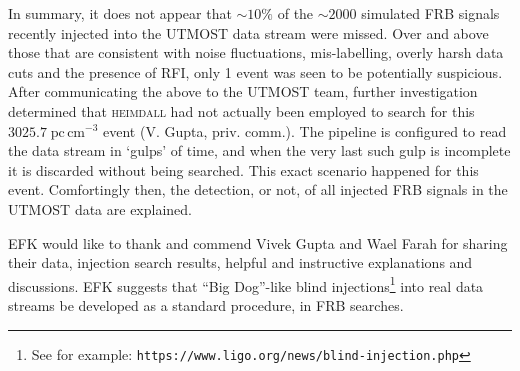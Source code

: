 \documentclass[RNAAS]{aastex62}
\begin{document}
In summary, it does not appear that $\sim10\%$ of the $\sim 2000$ simulated FRB signals recently injected into the UTMOST data stream were missed. Over and above those that are consistent with noise fluctuations, mis-labelling, overly harsh data cuts and the presence of RFI, only 1 event was seen to be potentially suspicious. After communicating the above to the UTMOST team, further investigation determined that \textsc{heimdall} had not actually been employed to search for this $3025.7\;\mathrm{pc}\,\mathrm{cm}^{-3}$ event (V. Gupta, priv. comm.). The pipeline is configured to read the data stream in `gulps' of time, and when the very last such gulp is incomplete it is discarded without being searched. This exact scenario happened for this event. 
Comfortingly then, the detection, or not, of all injected FRB signals in the UTMOST data are explained.


\acknowledgements

EFK would like to thank and commend Vivek Gupta and Wael Farah for sharing their data, injection search results, helpful and instructive explanations and discussions. EFK suggests that ``Big Dog''-like blind injections\footnote{See for example: \texttt{https://www.ligo.org/news/blind-injection.php}} into real data streams be developed as a standard procedure, in FRB searches.

\begin{samepage}


\end{samepage}

%
%
\end{document}

